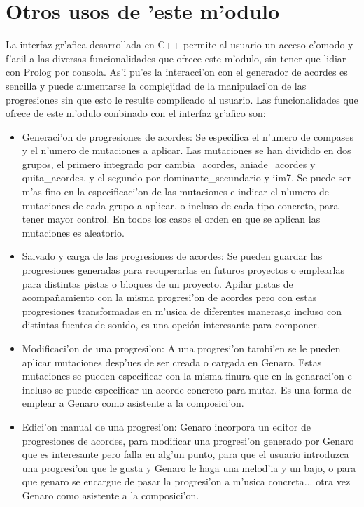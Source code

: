 \documentclass[a4paper,12pt]{article}
\begin{document}
\section {Otros usos de 'este m'odulo}
La interfaz gr'afica desarrollada en C++ permite al usuario un acceso c'omodo y f'acil a las diversas funcionalidades que ofrece este m'odulo, sin tener que lidiar con Prolog por consola. As'i pu'es la interacci'on con el generador de acordes es sencilla y puede aumentarse la complejidad de la manipulaci'on de las progresiones sin que esto le resulte complicado al usuario. Las funcionalidades que ofrece de este m'odulo conbinado con el interfaz gr'afico son:
\begin{itemize}
\item Generaci'on de progresiones de acordes: Se especifica el n'umero de compases y el n'umero de mutaciones a aplicar.  Las mutaciones se han dividido en dos grupos, el primero integrado por cambia\_acordes, aniade\_acordes y quita\_acordes, y el segundo por dominante\_secundario y iim7. Se puede ser m'as fino en la especificaci'on de las mutaciones e indicar el n'umero de mutaciones de cada grupo a aplicar, o incluso de cada tipo concreto, para tener mayor control. En todos los casos el orden en que se aplican las mutaciones es aleatorio.
\item Salvado y carga de las progresiones de acordes: Se pueden guardar las progresiones generadas para recuperarlas en futuros proyectos o emplearlas para distintas pistas o bloques de un proyecto. Apilar pistas de acompañamiento con la misma progresi'on de acordes pero con estas progresiones transformadas en m'usica de diferentes maneras,o incluso con distintas fuentes de sonido, es una opción interesante para componer.
\item Modificaci'on de una progresi'on: A una progresi'on tambi'en se le pueden aplicar mutaciones desp'ues de ser creada o cargada en Genaro. Estas mutaciones se pueden especificar con la misma finura que en la genaraci'on e incluso se puede especificar un acorde concreto para mutar. Es una forma de emplear a Genaro como asistente a la composici'on.
\item Edici'on manual de una progresi'on: Genaro incorpora un editor de progresiones de acordes, para modificar una progresi'on generado por Genaro que es interesante pero falla en alg'un punto, para que el usuario introduzca una progresi'on que le gusta y Genaro le haga una melod'ia y un bajo, o para que genaro se encargue de pasar la progresi'on a m'usica concreta... otra vez Genaro como asistente a la composici'on.
\end{itemize}
\end{document}
